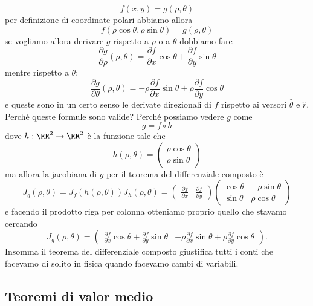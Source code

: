 \documentclass[11pt]{scrartcl}
\begin{document}
	$$f(x,y)=g(\rho,\theta)$$
	per definizione di coordinate polari abbiamo allora
	$$f(\rho \cos\theta,\rho\sin\theta)=g(\rho,\theta)$$
	se vogliamo allora derivare $g$ rispetto a $\rho$ o a $\theta$ dobbiamo fare
	$$\frac{\partial g}{\partial \rho}(\rho,\theta)=\frac{\partial f}{\partial x}\cos\theta+\frac{\partial f}{\partial y}\sin\theta$$
	mentre rispetto a $\theta$:
	$$\frac{\partial g}{\partial \theta}(\rho,\theta)=-\rho \frac{\partial f}{\partial x}\sin \theta+\rho\frac{\partial f}{\partial y}\cos\theta$$
	e queste sono in un certo senso le derivate direzionali di $f$ rispetto ai versori $\hat{\theta}$ e $\hat{r}$. Perché queste formule sono valide? Perché possiamo vedere $g$ come
	$$g=f\circ h$$
	dove $h:\RR^2\to\RR^2$ è la funzione tale che
	$$h(\rho,\theta)=\begin{pmatrix}
		\rho \cos \theta \\
		\rho \sin \theta
	\end{pmatrix}$$
	ma allora la jacobiana di $g$ per il teorema del differenziale composto è
	$$J_g(\rho,\theta)=J_f\left(h(\rho,\theta)\right)J_h(\rho,\theta)=\begin{pmatrix}
		\frac{\partial f}{\partial x} & \frac{\partial f}{\partial y}
	\end{pmatrix}
	\begin{pmatrix}
		\cos \theta & -\rho \sin\theta \\
		\sin \theta & \rho \cos\theta
	\end{pmatrix}
	$$
	e facendo il prodotto riga per colonna otteniamo proprio quello che stavamo cercando
	$$J_g(\rho,\theta)=
	\begin{pmatrix}
		\frac{\partial f}{\partial x}\cos\theta+\frac{\partial f}{\partial y}\sin\theta & -\rho \frac{\partial f}{\partial x}\sin \theta+\rho\frac{\partial f}{\partial y}\cos\theta
	\end{pmatrix}.
	$$
	Insomma il teorema del differenziale composto giustifica tutti i conti che facevamo di solito in fisica quando facevamo cambi di variabili.
	
	\subsection{Teoremi di valor medio}
	
\end{document}

